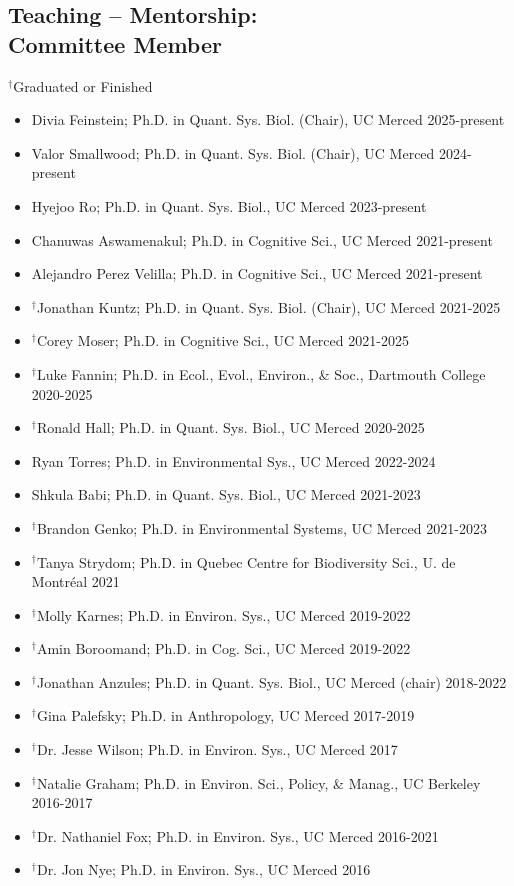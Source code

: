 \documentclass[margin,line,12pt]{res}
\begin{document}
\begin{resume}
\section{\sc Teaching -- Mentorship: \\ Committee Member}
{\footnotesize{${}^\dag$Graduated or Finished}}
\begin{itemize}
  \item Divia Feinstein; Ph.D. in Quant. Sys. Biol. (Chair), UC Merced \hfill 2025-present
  \item Valor Smallwood; Ph.D. in Quant. Sys. Biol. (Chair), UC Merced \hfill 2024-present
  \item Hyejoo Ro; Ph.D. in Quant. Sys. Biol., UC Merced \hfill 2023-present
  \item Chanuwas Aswamenakul; Ph.D. in Cognitive Sci., UC Merced \hfill 2021-present 
  \item Alejandro Perez Velilla; Ph.D. in Cognitive Sci., UC Merced \hfill 2021-present
  \item ${}^\dag$Jonathan Kuntz; Ph.D. in Quant. Sys. Biol. (Chair), UC Merced \hfill 2021-2025
  \item ${}^\dag$Corey Moser; Ph.D. in Cognitive Sci., UC Merced \hfill 2021-2025
  \item ${}^\dag$Luke Fannin; Ph.D. in Ecol., Evol., Environ., \& Soc., Dartmouth College \hfill 2020-2025
  \item ${}^\dag$Ronald Hall; Ph.D. in Quant. Sys. Biol., UC Merced \hfill 2020-2025
  \item Ryan Torres; Ph.D. in Environmental Sys., UC Merced \hfill 2022-2024
  \item Shkula Babi; Ph.D. in Quant. Sys. Biol., UC Merced \hfill 2021-2023
  \item ${}^\dag$Brandon Genko; Ph.D. in Environmental Systems, UC Merced \hfill 2021-2023
  \item ${}^\dag$Tanya Strydom; Ph.D. in Quebec Centre for Biodiversity Sci., U. de Montr\'eal \hfill 2021
  \item ${}^\dag$Molly Karnes; Ph.D. in Environ. Sys., UC Merced \hfill 2019-2022
  \item ${}^\dag$Amin Boroomand; Ph.D. in Cog. Sci., UC Merced \hfill 2019-2022
  \item ${}^\dag$Jonathan Anzules; Ph.D. in Quant. Sys. Biol., UC Merced (chair) \hfill 2018-2022
  \item ${}^\dag$Gina Palefsky; Ph.D. in Anthropology, UC Merced \hfill 2017-2019
  \item ${}^\dag$Dr. Jesse Wilson; Ph.D. in Environ. Sys., UC Merced \hfill 2017
  \item ${}^\dag$Natalie Graham; Ph.D. in Environ. Sci., Policy, \& Manag., UC Berkeley \hfill 2016-2017
  \item ${}^\dag$Dr. Nathaniel Fox; Ph.D. in Environ. Sys., UC Merced \hfill 2016-2021
  \item ${}^\dag$Dr. Jon Nye; Ph.D. in Environ. Sys., UC Merced \hfill 2016
\end{itemize}




\end{resume}
\end{document}

